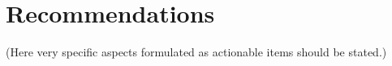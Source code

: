 \section{Recommendations}

(Here very specific aspects formulated as actionable items should be stated.)
